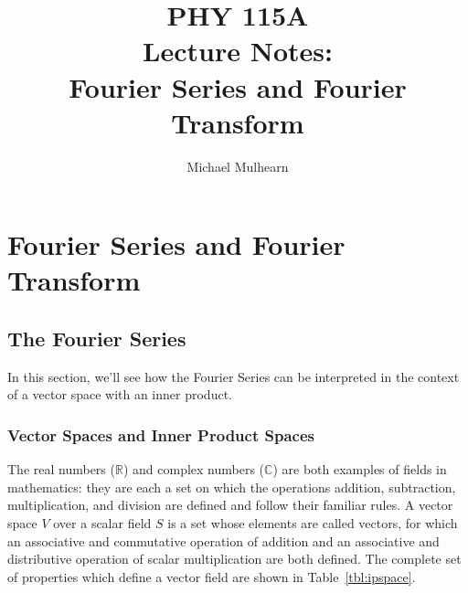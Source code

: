 \documentclass[12pt]{book}
\begin{document}
\newcommand{\ihbar}{\ensuremath{i \hbar}}
\newcommand{\Pss}{\ensuremath{\Psi^*}}
\newcommand{\dPsidt}{\ensuremath{ \frac{\partial \Psi}{\partial t} }}
\newcommand{\dPsidx}{\ensuremath{ \frac{\partial \Psi}{\partial x} }}
\newcommand{\ddPsidx}{\ensuremath{ \frac{\partial^2 \Psi}{\partial x^2} }}
\newcommand{\dPssdt}{\ensuremath{ \frac{\partial \Psi^*}{\partial t} }}
\newcommand{\dPssdx}{\ensuremath{ \frac{\partial \Psi^*}{\partial x} }}
\newcommand{\ddPssdx}{\ensuremath{ \frac{\partial^2 \Psi^*}{\partial x^2} }}

\newcommand{\dphidt}{\ensuremath{ \frac{d \phi}{dt} }}
\newcommand{\dpsidx}{\ensuremath{ \frac{d \psi}{dx} }}
\newcommand{\ddpsidx}{\ensuremath{ \frac{d^2 \psi}{dx^2} }}


\title{PHY 115A \\ Lecture Notes: \\ 
Fourier Series and Fourier Transform \\}
\author{Michael Mulhearn}

\maketitle

\appendix
\setcounter{chapter}{5}
\chapter{Fourier Series and Fourier Transform}

\section{The Fourier Series}

In this section, we'll see how the Fourier Series can be interpreted in the context of a vector space with an inner product.  

\subsection{Vector Spaces and Inner Product Spaces}
The real numbers ($\mathbb{R}$) and complex numbers ($\mathbb{C}$) are both examples of fields in mathematics:  they are each a set on which the operations addition, subtraction, multiplication, and division are defined and follow their familiar rules.  A vector space $V$ over a scalar field $S$ is a set whose elements are called vectors, for which an associative and commutative operation of addition and an associative and distributive operation of scalar multiplication are both defined.    The complete set of properties which define a vector field are shown in Table~\ref{tbl:ipspace}.  
\end{document}
